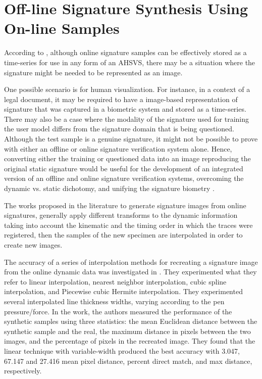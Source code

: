 \section{Off-line Signature Synthesis Using On-line Samples}

According to \cite{guest2013assessment}, although online signature samples can be effectively stored as a time-series for use in any form of an AHSVS, there may be a situation where the signature might be needed to be represented as an image. 
 
One possible scenario is for human visualization. For instance, in a context of a legal document, it may be required to have a image-based representation of signature that was captured in a biometric system and stored as a time-series. There may also be a case where the modality of the signature used for training the user model differs from the signature domain that is being questioned. Although the test sample is a genuine signature, it might not be possible to prove with either an offline or online signature verification system alone. Hence, converting either the training or questioned data into an image reproducing the original static signature would be useful for the development of an integrated version of an offline and online signature verification systems, overcoming the dynamic vs. static dichotomy, and unifying the signature biometry \cite{chapter}.

The works proposed in the literature to generate signature images from online signatures, generally apply different transforms to the dynamic information taking into account the kinematic and the timing order in which the traces were registered, then the samples of the new specimen are interpolated in order to create new images. 

The accuracy of a series of interpolation methods for recreating a signature image from the online dynamic data was investigated in  \cite{guest2013assessment}. They experimented what they refer to linear interpolation, nearest neighbor interpolation, cubic spline interpolation, and Piecewise cubic Hermite interpolation. They experimented several interpolated line thickness widths, varying according to the pen pressure/force. In the work, the authors measured the performance of the synthetic samples using three statistics: the mean Euclidean distance between the synthetic sample and the real, the maximum distance in pixels between the two images, and the percentage of pixels in the recreated image. They found that the linear technique with variable-width produced the best accuracy with 3.047, 67.147 and 27.416 mean pixel distance, percent direct match, and max distance, respectively.

